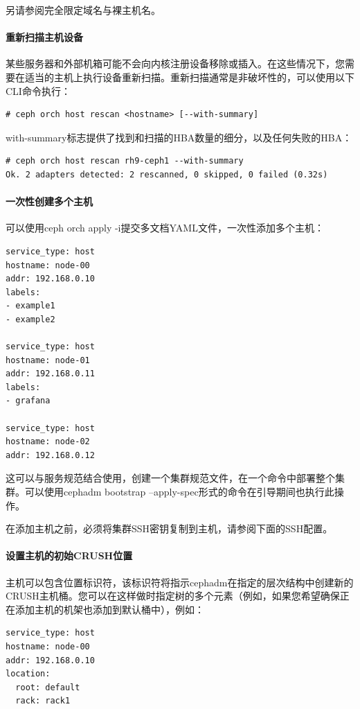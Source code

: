 \documentclass[12pt,UTF8]{ctexbook}
\begin{document}
另请参阅完全限定域名与裸主机名。

\paragraph{重新扫描主机设备}

某些服务器和外部机箱可能不会向内核注册设备移除或插入。在这些情况下，您需要在适当的主机上执行设备重新扫描。重新扫描通常是非破坏性的，可以使用以下CLI命令执行：
\begin{verbatim}
# ceph orch host rescan <hostname> [--with-summary]
\end{verbatim}

with-summary标志提供了找到和扫描的HBA数量的细分，以及任何失败的HBA：
\begin{verbatim}
# ceph orch host rescan rh9-ceph1 --with-summary
Ok. 2 adapters detected: 2 rescanned, 0 skipped, 0 failed (0.32s)
\end{verbatim}

\paragraph{一次性创建多个主机}

可以使用ceph orch apply -i提交多文档YAML文件，一次性添加多个主机：
\begin{verbatim}
service_type: host
hostname: node-00
addr: 192.168.0.10
labels:
- example1
- example2

service_type: host
hostname: node-01
addr: 192.168.0.11
labels:
- grafana

service_type: host
hostname: node-02
addr: 192.168.0.12
\end{verbatim}

这可以与服务规范结合使用，创建一个集群规范文件，在一个命令中部署整个集群。可以使用cephadm bootstrap --apply-spec形式的命令在引导期间也执行此操作。

在添加主机之前，必须将集群SSH密钥复制到主机，请参阅下面的SSH配置。

\paragraph{设置主机的初始CRUSH位置}

主机可以包含位置标识符，该标识符将指示cephadm在指定的层次结构中创建新的CRUSH主机桶。您可以在这样做时指定树的多个元素（例如，如果您希望确保正在添加主机的机架也添加到默认桶中），例如：
\begin{verbatim}
service_type: host
hostname: node-00
addr: 192.168.0.10
location:
  root: default
  rack: rack1
\end{verbatim}
\end{document}
